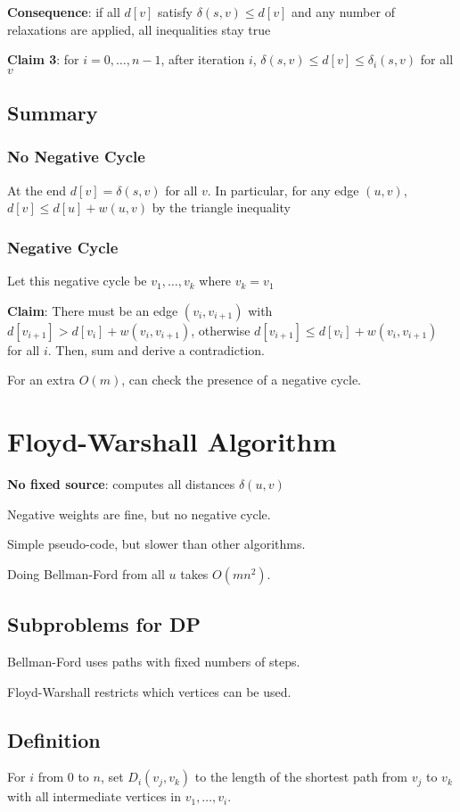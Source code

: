 \documentclass[11pt]{article}
\begin{document}
\textbf{Consequence}: if all \(d[v]\) satisfy \(\delta(s,v) \le d[v]\) and any number of relaxations
are applied, all inequalities stay true

\textbf{Claim 3}: for \(i = 0, \dots, n-1\), after iteration \(i\),
\(\delta(s,v) \le d[v] \le \delta_{i}(s,v)\) for all \(v\)
\subsection{Summary}
\label{sec:org91a2133}
\subsubsection{No Negative Cycle}
\label{sec:org5263bf0}
At the end \(d[v] = \delta(s,v)\) for all \(v\).
In particular, for any edge \((u,v)\), \(d[v] \le d[u] + w(u,v)\) by the triangle inequality
\subsubsection{Negative Cycle}
\label{sec:org9984bf4}
Let this negative cycle be \(v_{1}, \dots, v_{k}\) where \(v_{k} = v_{1}\)

\textbf{Claim}: There must be an edge \((v_{i}, v_{i+1})\) with
\(d[v_{i+1}] > d[v_{i}] + w(v_{i}, v_{i+1})\), otherwise \(d[v_{i+1}] \le d[v_{i}] + w(v_{i}, v_{i+1})\)
for all \(i\). Then, sum and derive a contradiction.

For an extra \(O(m)\), can check the presence of a negative cycle.
\section{Floyd-Warshall Algorithm}
\label{sec:orgdb7e6a4}
\textbf{No fixed source}: computes all distances \(\delta(u,v)\)

Negative weights are fine, but no negative cycle.

Simple pseudo-code, but slower than other algorithms.

Doing Bellman-Ford from all \(u\) takes \(O(mn^{2})\).
\subsection{Subproblems for DP}
\label{sec:org1ca095a}
Bellman-Ford uses paths with fixed numbers of steps.

Floyd-Warshall restricts which vertices can be used.
\subsection{Definition}
\label{sec:org60d5d27}
For \(i\) from 0 to \(n\), set \(D_{i}(v_{j}, v_{k})\) to the length of the shortest path from
\(v_{j}\) to \(v_{k}\) with all intermediate vertices in \(v_{1}, \dots, v_{i}\).
\end{document}
